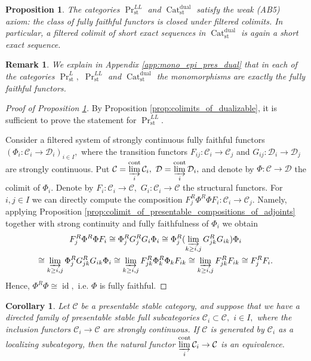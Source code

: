 \documentclass[11pt,leqno]{amsart}
\newtheorem{prop}[theo]{Proposition}
\newtheorem{cor}[theo]{Corollary}
\newtheorem{remark}[theo]{Remark}
\numberwithin{equation}{section}
\newcommand{\indlim}[1][]{\mathop{\varinjlim}\limits_{#1}}
\newcommand{\Cat}{\operatorname{Cat}}
\newcommand{\cont}{\operatorname{cont}}
\newcommand{\st}{\operatorname{st}}
\newcommand{\dual}{\operatorname{dual}}
\newcommand{\cD}{{\mathcal D}}
\newcommand{\cC}{{\mathcal C}}
\newcommand{\id}{\operatorname{id}}
\begin{document}
\begin{prop}\label{prop:weak_AB5_Pr^LL} The categories $\Pr^{LL}_{\st}$ and $\Cat_{\st}^{\dual}$ satisfy the weak (AB5) axiom: the class of fully faithful functors is closed under filtered colimits. In particular, a filtered colimit of short exact sequences in $\Cat_{\st}^{\dual}$ is again a short exact sequence.\end{prop}

\begin{remark}We explain in Appendix \ref{app:mono_epi_pres_dual} that in each of the categories $\Pr^L_{\st},$ $\Pr^{LL}_{\st}$ and $\Cat_{\st}^{\dual}$ the monomorphisms are exactly the fully faithful functors.\end{remark}

\begin{proof}[Proof of Proposition \ref{prop:weak_AB5_Pr^LL}] By Proposition \ref{prop:colimits_of_dualizable}, it is sufficient to prove the statement for $\Pr^{LL}_{\st}.$

Consider a filtered system of strongly continuous fully faithful functors $(\Phi_i:\cC_i\to\cD_i)_{i\in I},$ where the transition functors $F_{ij}:\cC_i\to\cC_j$ and $G_{ij}:\cD_i\to\cD_j$ are strongly continuous. Put $\cC=\indlim[i]^{\cont}\cC_i,$ $\cD=\indlim[i]^{\cont}\cD_i,$ and denote by $\Phi:\cC\to\cD$ the colimit of $\Phi_i.$ Denote by $F_i:\cC_i\to\cC,$ $G_i:\cC_i\to\cC$ the structural functors. For $i,j\in I$ we can directly compute the composition $F_j^R\Phi^R\Phi F_i:\cC_i\to\cC_j.$ Namely, applying Proposition \ref{prop:colimit_of_presentable_compositions_of_adjoints} together with strong continuity and fully faithfulness of $\Phi_i$ we obtain
\begin{multline*}F_j^R\Phi^R\Phi F_i\cong \Phi_j^R G_j^RG_i\Phi_i\cong\Phi_j^R(\indlim[k\geq i,j]G_{jk}^R G_{ik})\Phi_i\\ \cong
 \indlim[k\geq i,j]\Phi_j^R G_{jk}^R G_{ik} \Phi_i\cong \indlim[k\geq i,j]F_{jk}^R\Phi_k^R\Phi_k F_{ik}\cong \indlim[k\geq i,j]F_{jk}^R F_{ik}\cong F_j^R F_i.\end{multline*}
Hence, $\Phi^R\Phi\cong\id,$ i.e. $\Phi$ is fully faithful.
\end{proof}

\begin{cor}\label{cor:directed_unions} Let $\cC$ be a presentable stable category, and suppose that we have a directed family of presentable stable full subcategories $\cC_i\subset\cC,$ $i\in I,$ where the inclusion functors $\cC_i\to\cC$ are strongly continuous. If $\cC$ is generated by $\cC_i$ as a localizing subcategory, then the natural functor $\indlim[i]^{\cont}\cC_i\to \cC$ is an equivalence.\end{cor}
\end{document}
